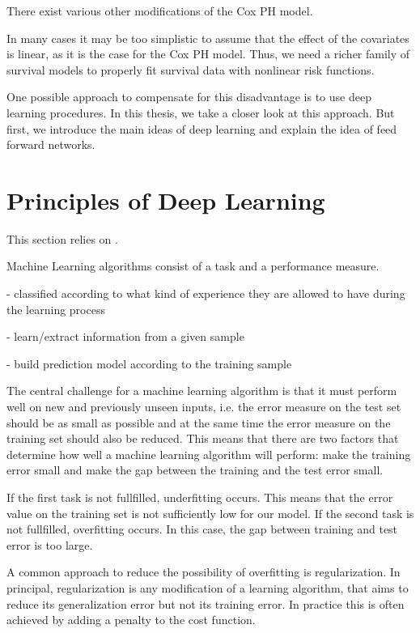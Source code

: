 \documentclass[12pt, a4paper]{article}
\theoremstyle{definition}
\theoremstyle{plain}
\numberwithin{equation}{section}
\numberwithin{figure}{section}
\numberwithin{table}{section}
\begin{document}
	There exist various other modifications of the Cox PH model.
	
	In many cases it may be too simplistic to assume that the effect of the covariates is linear, as it is the case for the Cox PH model.
	Thus, we need a richer family of survival models to properly fit survival data with nonlinear risk functions.
	
	One possible approach to compensate for this disadvantage is to use deep learning procedures.
	In this thesis, we take a closer look at this approach.
	But first, we introduce the main ideas of deep learning and explain the idea of feed forward networks.
	\newpage
	
	\section{Principles of Deep Learning}\label{basicsdl}
	This section relies on \citet*{deeplbook}.
	
	
	Machine Learning algorithms consist of a task and a performance measure.
	
	- classified according to what kind of experience they are allowed to have during the learning process
	
	- learn/extract information from a given sample
	
	- build prediction model according to the training sample
	
	
	
	The central challenge for a machine learning algorithm is that it must perform well on new and previously unseen inputs, i.e. the error measure on the test set should be as small as possible and at the same time the error measure on the training set should also be reduced.
	This means that there are two factors that determine how well a machine learning algorithm will perform:
	make the training error small and make the gap between the training and the test error small.
	
	If the first task is not fullfilled, underfitting occurs. This means that the error value on the training set is not sufficiently low for our model.
	If the second task is not fullfilled, overfitting occurs. In this case, the gap between training and test error is too large.
	
	
	A common approach to reduce the possibility of overfitting is regularization.
	In principal, regularization is any modification of a learning algorithm, that aims to reduce its generalization error but not its training error.
	In practice this is often achieved by adding a penalty to the cost function.
	
\end{document}
